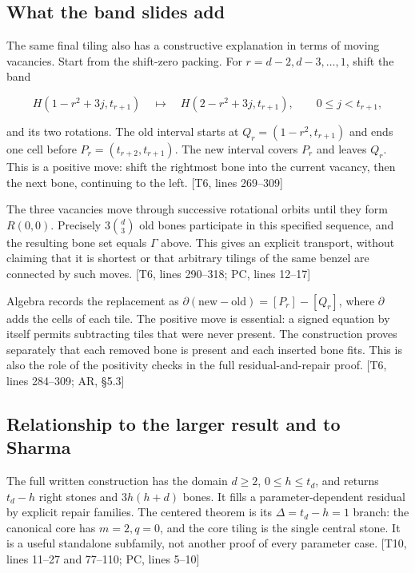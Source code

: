 \documentclass[
  11pt,
]{article}
\begin{document}
\subsection{What the band slides add}\label{what-the-band-slides-add}

The same final tiling also has a constructive explanation in terms of
moving vacancies. Start from the shift-zero packing. For
\(r=d-2,d-3,\ldots,1\), shift the band

\[
H(1-r^2+3j,t_{r+1})
\quad\longmapsto\quad
H(2-r^2+3j,t_{r+1}),\qquad0\le j<t_{r+1},
\]

and its two rotations. The old interval starts at
\(Q_r=(1-r^2,t_{r+1})\) and ends one cell before
\(P_r=(t_{r+2},t_{r+1})\). The new interval covers \(P_r\) and leaves
\(Q_r\). This is a positive move: shift the rightmost bone into the
current vacancy, then the next bone, continuing to the left. {[}T6,
lines 269--309{]}

The three vacancies move through successive rotational orbits until they
form \(R(0,0)\). Precisely \(3\binom d3\) old bones participate in this
specified sequence, and the resulting bone set equals \(\Gamma\) above.
This gives an explicit transport, without claiming that it is shortest
or that arbitrary tilings of the same benzel are connected by such
moves. {[}T6, lines 290--318; PC, lines 12--17{]}

Algebra records the replacement as
\(\partial(\mathrm{new}-\mathrm{old})=[P_r]-[Q_r]\), where \(\partial\)
adds the cells of each tile. The positive move is essential: a signed
equation by itself permits subtracting tiles that were never present.
The construction proves separately that each removed bone is present and
each inserted bone fits. This is also the role of the positivity checks
in the full residual-and-repair proof. {[}T6, lines 284--309; AR,
§5.3{]}

\subsection{Relationship to the larger result and to
Sharma}\label{relationship-to-the-larger-result-and-to-sharma}

The full written construction has the domain \(d\ge2\),
\(0\le h\le t_d\), and returns \(t_d-h\) right stones and \(3h(h+d)\)
bones. It fills a parameter-dependent residual by explicit repair
families. The centered theorem is its \(\Delta=t_d-h=1\) branch: the
canonical core has \(m=2,q=0\), and the core tiling is the single
central stone. It is a useful standalone subfamily, not another proof of
every parameter case. {[}T10, lines 11--27 and 77--110; PC, lines
5--10{]}
\end{document}
